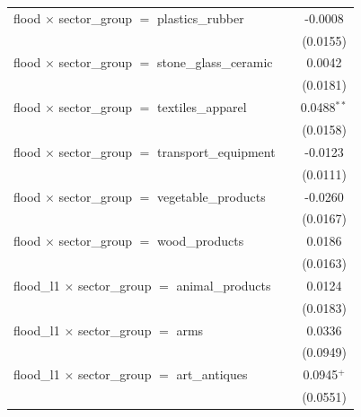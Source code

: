 \begin{tabular}{lcc}
   flood $\times$ sector\_group $=$ plastics\_rubber               &                       & -0.0008\\   
                                                                   &                       & (0.0155)\\   
   flood $\times$ sector\_group $=$ stone\_glass\_ceramic          &                       & 0.0042\\   
                                                                   &                       & (0.0181)\\   
   flood $\times$ sector\_group $=$ textiles\_apparel              &                       & 0.0488$^{**}$\\   
                                                                   &                       & (0.0158)\\   
   flood $\times$ sector\_group $=$ transport\_equipment           &                       & -0.0123\\   
                                                                   &                       & (0.0111)\\   
   flood $\times$ sector\_group $=$ vegetable\_products            &                       & -0.0260\\   
                                                                   &                       & (0.0167)\\   
   flood $\times$ sector\_group $=$ wood\_products                 &                       & 0.0186\\   
                                                                   &                       & (0.0163)\\   
   flood\_l1 $\times$ sector\_group $=$ animal\_products           &                       & 0.0124\\   
                                                                   &                       & (0.0183)\\   
   flood\_l1 $\times$ sector\_group $=$ arms                       &                       & 0.0336\\   
                                                                   &                       & (0.0949)\\   
   flood\_l1 $\times$ sector\_group $=$ art\_antiques              &                       & 0.0945$^{+}$\\   
                                                                   &                       & (0.0551)\\   

\end{tabular}
